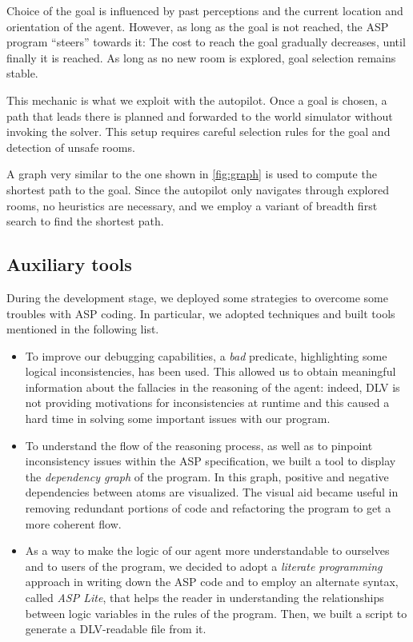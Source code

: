 \documentclass{llncs}
\begin{document}
Choice of the goal is influenced by past perceptions and the current location and orientation of the agent. However, as long as the goal is not reached, the ASP program \enquote{steers} towards it: The cost to reach the goal gradually decreases, until finally it is reached. As long as no new room is explored, goal selection remains stable.

This mechanic is what we exploit with the autopilot. Once a goal is chosen, a path that leads there is planned and forwarded to the world simulator without invoking the solver. This setup requires careful selection rules for the goal and detection of unsafe rooms.

A graph very similar to the one shown in \ref{fig:graph} is used to compute the shortest path to the goal.
Since the autopilot only navigates through explored rooms, no heuristics are necessary, and we employ a variant of breadth first search to find the shortest path.


\subsection{Auxiliary tools}

During the development stage, we deployed some strategies to overcome some troubles with ASP coding. In particular, we adopted techniques and built tools mentioned in the following list.

\begin{itemize}
	\item To improve our debugging capabilities, a \emph{bad} predicate, highlighting some logical inconsistencies, has been used.
	This allowed us to obtain meaningful information about the fallacies in the reasoning of the agent: indeed, DLV is not providing motivations for inconsistencies at runtime and this caused a hard time in solving some important issues with our program.
	\item To understand the flow of the reasoning process, as well as to pinpoint inconsistency issues within the ASP specification, we built a tool to display the \emph{dependency graph} of the program.
	In this graph, positive and negative dependencies between atoms are visualized.
	The visual aid became useful in removing redundant portions of code and refactoring the program to get a more coherent flow.
	\item As a way to make the logic of our agent more understandable to ourselves and to users of the program, we decided to adopt a \emph{literate programming} approach in writing down the ASP code and to employ an alternate syntax, called \emph{ASP Lite}, that helps the reader in understanding the relationships between logic variables in the rules of the program.
	Then, we built a script to generate a DLV-readable file from it.
\end{itemize}
\end{document}
